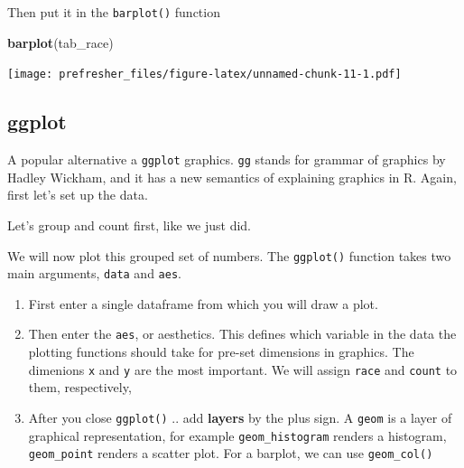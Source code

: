 \documentclass[]{book}
\newenvironment{Shaded}{\begin{snugshade}}{\end{snugshade}}
\newcommand{\KeywordTok}[1]{\textcolor[rgb]{0.13,0.29,0.53}{\textbf{#1}}}
\newcommand{\DataTypeTok}[1]{\textcolor[rgb]{0.13,0.29,0.53}{#1}}
\newcommand{\StringTok}[1]{\textcolor[rgb]{0.31,0.60,0.02}{#1}}
\newcommand{\OperatorTok}[1]{\textcolor[rgb]{0.81,0.36,0.00}{\textbf{#1}}}
\newcommand{\NormalTok}[1]{#1}
\providecommand{\tightlist}{%
  \setlength{\itemsep}{0pt}\setlength{\parskip}{0pt}}
\theoremstyle{definition}
\theoremstyle{definition}
\theoremstyle{definition}
\theoremstyle{remark}
\begin{document}
Then put it in the \texttt{barplot()} function

\begin{Shaded}
\begin{Highlighting}[]
\KeywordTok{barplot}\NormalTok{(tab_race)}
\end{Highlighting}
\end{Shaded}

\texttt{[image: prefresher\_files/figure-latex/unnamed-chunk-11-1.pdf]}

\subsection{ggplot}\label{ggplot}

A popular alternative a \texttt{ggplot} graphics. \texttt{gg} stands for
grammar of graphics by Hadley Wickham, and it has a new semantics of
explaining graphics in R. Again, first let's set up the data.

Let's group and count first, like we just did.

\begin{Shaded}
\end{Shaded}

We will now plot this grouped set of numbers. The \texttt{ggplot()}
function takes two main arguments, \texttt{data} and \texttt{aes}.

\begin{enumerate}
\def\labelenumi{\arabic{enumi}.}
\tightlist
\item
  First enter a single dataframe from which you will draw a plot.
\item
  Then enter the \texttt{aes}, or aesthetics. This defines which
  variable in the data the plotting functions should take for pre-set
  dimensions in graphics. The dimenions \texttt{x} and \texttt{y} are
  the most important. We will assign \texttt{race} and \texttt{count} to
  them, respectively,
\item
  After you close \texttt{ggplot()} .. add \textbf{layers} by the plus
  sign. A \texttt{geom} is a layer of graphical representation, for
  example \texttt{geom\_histogram} renders a histogram,
  \texttt{geom\_point} renders a scatter plot. For a barplot, we can use
  \texttt{geom\_col()}
\end{enumerate}
\end{document}
